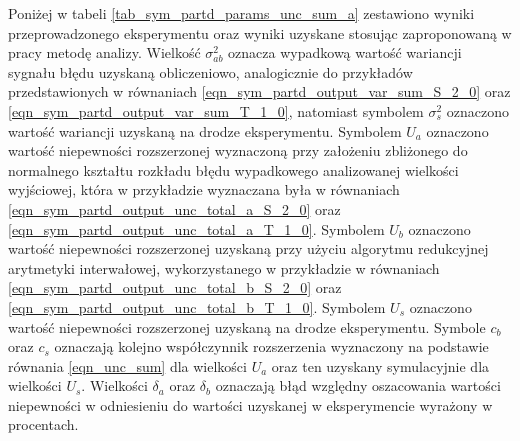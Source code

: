 Poniżej w tabeli \ref{tab_sym_partd_params_unc_sum_a} zestawiono wyniki przeprowadzonego eksperymentu oraz wyniki uzyskane stosując zaproponowaną w pracy metodę analizy. Wielkość $\sigma_{ab}^{2}$ oznacza wypadkową wartość wariancji sygnału błędu uzyskaną obliczeniowo, analogicznie do przykładów przedstawionych w równaniach \eqref{eqn_sym_partd_output_var_sum_S_2_0} oraz \eqref{eqn_sym_partd_output_var_sum_T_1_0}, natomiast symbolem $\sigma_{s}^{2}$ oznaczono wartość wariancji uzyskaną na drodze eksperymentu. Symbolem $U_{a}$ oznaczono wartość niepewności rozszerzonej wyznaczoną przy założeniu zbliżonego do normalnego kształtu rozkładu błędu wypadkowego analizowanej wielkości wyjściowej, która w przykładzie wyznaczana była w równaniach \eqref{eqn_sym_partd_output_unc_total_a_S_2_0} oraz \eqref{eqn_sym_partd_output_unc_total_a_T_1_0}. Symbolem $U_{b}$ oznaczono wartość niepewności rozszerzonej uzyskaną przy użyciu algorytmu redukcyjnej arytmetyki interwałowej, wykorzystanego w przykładzie w równaniach \eqref{eqn_sym_partd_output_unc_total_b_S_2_0} oraz \eqref{eqn_sym_partd_output_unc_total_b_T_1_0}. Symbolem $U_{s}$ oznaczono wartość niepewności rozszerzonej uzyskaną na drodze eksperymentu. Symbole $c_{b}$ oraz $c_{s}$ oznaczają kolejno współczynnik rozszerzenia wyznaczony na podstawie równania \eqref{eqn_unc_sum} dla wielkości $U_{a}$ oraz ten uzyskany symulacyjnie dla wielkości $U_{s}$. Wielkości $\delta_{a}$ oraz $\delta_{b}$ oznaczają błąd względny oszacowania wartości niepewności w odniesieniu do wartości uzyskanej w eksperymencie wyrażony w procentach.

